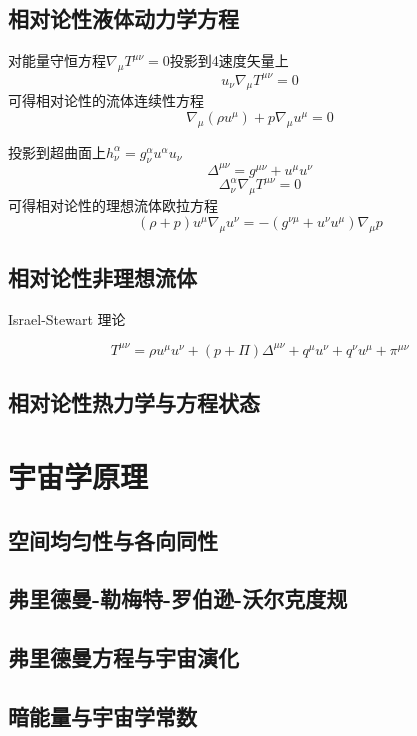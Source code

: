 \documentclass[a4paper]{report}
\begin{document}
\section{相对论性液体动力学方程}
对能量守恒方程$\nabla_\mu T^{\mu\nu}=0$投影到4速度矢量上
\begin{equation}
    u_\nu \nabla_\mu T^{\mu\nu}=0
\end{equation}
可得相对论性的流体连续性方程
\begin{equation}
    \nabla_\mu (\rho u^\mu) + p \nabla_\mu u^\mu =0
\end{equation}

投影到超曲面上$h^\alpha_\nu = g^\alpha_\nu u^\alpha u_\nu$
\begin{equation}
    \Delta^{\mu\nu} = g^{\mu\nu}+u^\mu u^\nu
\end{equation}
\begin{equation}
    \Delta^\alpha_\nu \nabla_\mu T^{\mu\nu}=0
\end{equation}
可得相对论性的理想流体欧拉方程
\begin{equation}
    (\rho + p)u^\mu \nabla_\mu u^\nu = -(g^{\nu\mu}+u^\nu u^\mu)\nabla_\mu p
\end{equation}


\section{相对论性非理想流体}

Israel-Stewart 理论

\begin{equation}
    T^{\mu\nu}=\rho u^\mu u^\nu + (p+\Pi)\Delta ^{\mu\nu} + q^\mu u^\nu + q^\nu u^\mu + \pi^{\mu\nu}
\end{equation}

\section{相对论性热力学与方程状态}


\chapter{宇宙学原理}
\section{空间均匀性与各向同性}
\section{弗里德曼-勒梅特-罗伯逊-沃尔克度规}
\section{弗里德曼方程与宇宙演化}
\section{暗能量与宇宙学常数}


%
\end{document}
